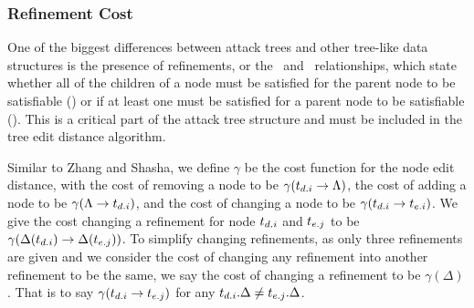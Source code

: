 \subsubsection{Refinement Cost}
One of the biggest differences between attack trees and other tree-like data structures is the presence of refinements, or the \AND\ and \OR\ relationships, which state whether all of the children of a node must be satisfied for the parent node to be satisfiable (\AND) or if at least one must be satisfied for a parent node to be satisfiable (\OR). This is a critical part of the attack tree structure and must be included in the tree edit distance algorithm.




\begin{definition}\label{def:cost-function}
    Similar to Zhang and Shasha, we define $\gamma$ be the cost function for the node edit distance, with the cost of removing a node to be $\gamma(t_{{d}.{i}} \rightarrow {\Lambda})$, the cost of adding a node to be $\gamma({\Lambda}\rightarrow t_{{d}.{i}})$, and the cost of changing a node to be $\gamma(t_{{d}.{i}} \rightarrow t_{{e}.{i}})$. We give the cost changing a refinement for node  $t_{{d}.{i}}$ and $t_{{e}.{j}}$ to be $\gamma(\Delta(t_{{d}.{i}}) \rightarrow \Delta(t_{{e}.{j}}))$. To simplify changing refinements, as only three refinements are given and we consider the cost of changing any refinement into another refinement to be the same, we say the cost of changing a refinement to be $\gamma(\Delta)$. That is to say $\gamma(t_{{d}.{i}} \rightarrow t_{{e}.{j}})$ for any $t_{{d}.{i}}.\Delta \ne t_{{e}.{j}}.\Delta$.
\end{definition}



